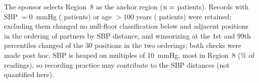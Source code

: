 \documentclass[AMA,Times1COL]{WileyNJDv5}
\begin{document}
The sponsor selects Region~8 as the anchor region ($n = \numval{nR8}$ patients). Records with SBP $= 0$~mmHg ( patients) or age $> 100$ years ( patients) were retained; excluding them changed no null-floor classification below and  adjacent positions in the ordering of partners by SBP distance, and winsorizing at the 1st and 99th percentiles changed  of the 30 positions in the two orderings; both checks were made post hoc. SBP is heaped on multiples of 10~mmHg, most in Region~8 (\% of readings), so recording practice may contribute to the SBP distances (not quantified here).

\end{document}
